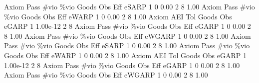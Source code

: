        Axiom {\VBAR} Pass        \#vio        \%vio       Goods         Obs         Eff  
       eSARP {\VBAR}    1           0        0.00           2           8        1.00  
{\smallskip}
{\smallskip}
{\smallskip}
       Axiom {\VBAR} Pass        \#vio        \%vio       Goods         Obs         Eff  
       eWARP {\VBAR}    1           0        0.00           2           8        1.00  
{\smallskip}
       Axiom {\VBAR}       AEI        Tol      Goods        Obs 
       eGARP {\VBAR}         1   1.00e-12          2          8 
{\smallskip}
{\smallskip}
{\smallskip}
       Axiom {\VBAR} Pass        \#vio        \%vio       Goods         Obs         Eff  
       eGARP {\VBAR}    1           0        0.00           2           8        1.00  
{\smallskip}
{\smallskip}
{\smallskip}
       Axiom {\VBAR} Pass        \#vio        \%vio       Goods         Obs         Eff  
      eWGARP {\VBAR}    1           0        0.00           2           8        1.00  
{\smallskip}
{\smallskip}
{\smallskip}
       Axiom {\VBAR} Pass        \#vio        \%vio       Goods         Obs         Eff  
       eSARP {\VBAR}    1           0        0.00           2           8        1.00  
{\smallskip}
{\smallskip}
{\smallskip}
       Axiom {\VBAR} Pass        \#vio        \%vio       Goods         Obs         Eff  
       eWARP {\VBAR}    1           0        0.00           2           8        1.00  
{\smallskip}
       Axiom {\VBAR}       AEI        Tol      Goods        Obs 
       eGARP {\VBAR}         1   1.00e-12          2          8 
{\smallskip}
{\smallskip}
{\smallskip}
       Axiom {\VBAR} Pass        \#vio        \%vio       Goods         Obs         Eff  
       eGARP {\VBAR}    1           0        0.00           2           8        1.00  
{\smallskip}
{\smallskip}
{\smallskip}
       Axiom {\VBAR} Pass        \#vio        \%vio       Goods         Obs         Eff  
      eWGARP {\VBAR}    1           0        0.00           2           8        1.00  
